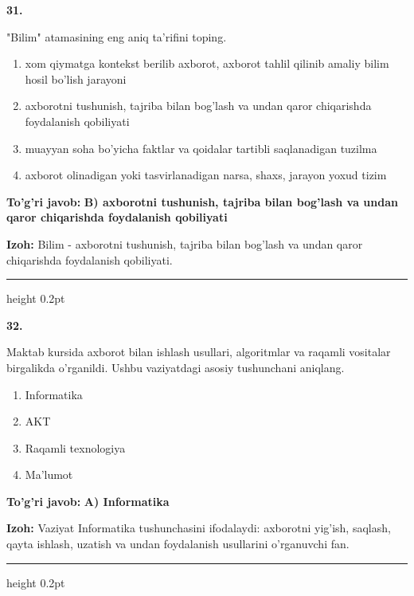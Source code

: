 \documentclass[10pt,a4paper,oneside]{article}
\begin{document}
\noindent\textbf{\color{ink}31.}
\par
"Bilim" atamasining eng aniq ta'rifini toping.
\begin{enumerate}[label=\Alph*),leftmargin=9mm]
\item xom qiymatga kontekst berilib axborot, axborot tahlil qilinib amaliy bilim hosil bo'lish jarayoni
\item axborotni tushunish, tajriba bilan bog'lash va undan qaror chiqarishda foydalanish qobiliyati
\item muayyan soha bo'yicha faktlar va qoidalar tartibli saqlanadigan tuzilma
\item axborot olinadigan yoki tasvirlanadigan narsa, shaxs, jarayon yoxud tizim
\end{enumerate}
\begin{tcolorbox}[enhanced,breakable,colback=teal!4,colframe=teal!50!black,boxrule=0.5pt,arc=1.1mm,left=3mm,right=3mm,top=1.7mm,bottom=1.7mm,before skip=2mm,after skip=2mm]
\textbf{\color{teal}To'g'ri javob:} \textbf{B) axborotni tushunish, tajriba bilan bog'lash va undan qaror chiqarishda foydalanish qobiliyati}
\par\smallskip
\textbf{Izoh:} Bilim - axborotni tushunish, tajriba bilan bog'lash va undan qaror chiqarishda foydalanish qobiliyati.
\end{tcolorbox}
\vspace{2mm}\hrule height 0.2pt \vspace{3mm}

\noindent\textbf{\color{ink}32.}
\par
Maktab kursida axborot bilan ishlash usullari, algoritmlar va raqamli vositalar birgalikda o'rganildi. Ushbu vaziyatdagi asosiy tushunchani aniqlang.
\begin{enumerate}[label=\Alph*),leftmargin=9mm]
\item Informatika
\item AKT
\item Raqamli texnologiya
\item Ma'lumot
\end{enumerate}
\begin{tcolorbox}[enhanced,breakable,colback=teal!4,colframe=teal!50!black,boxrule=0.5pt,arc=1.1mm,left=3mm,right=3mm,top=1.7mm,bottom=1.7mm,before skip=2mm,after skip=2mm]
\textbf{\color{teal}To'g'ri javob:} \textbf{A) Informatika}
\par\smallskip
\textbf{Izoh:} Vaziyat Informatika tushunchasini ifodalaydi: axborotni yig'ish, saqlash, qayta ishlash, uzatish va undan foydalanish usullarini o'rganuvchi fan.
\end{tcolorbox}
\vspace{2mm}\hrule height 0.2pt \vspace{3mm}
\end{document}
